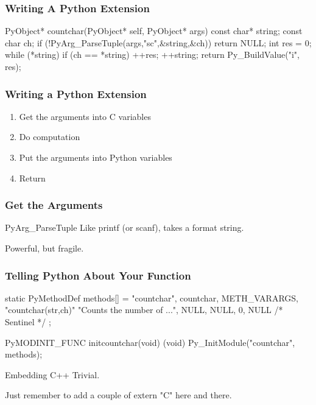 \begin{frame}[fragile]
\frametitle{Writing A Python Extension}

\begin{ccode}
PyObject* countchar(PyObject* self, PyObject* args) {
    const char* string;
    const char ch;
    if (!PyArg_ParseTuple(args,"sc",&string,&ch))
        return NULL;
    int res = 0;
    while (*string) {
        if (ch == *string) ++res;
        ++string;
    }
    return Py_BuildValue("i", res);
}
\end{ccode}
\end{frame}

\begin{frame}[fragile]
\frametitle{Writing a Python Extension}
\begin{enumerate}
\item Get the arguments into \alert{C variables}
\item Do computation
\item Put the arguments into \alert{Python variables}
\item Return
\end{enumerate}
\end{frame}

\begin{frame}[fragile]
\frametitle{Get the Arguments}

\begin{block}{PyArg\_ParseTuple}
Like \alert{printf} (or \alert{scanf}), takes a format string.

Powerful, but fragile.
\end{block}
\end{frame}

\begin{frame}[fragile]
\frametitle{Telling Python About Your Function}

\begin{ccode}
static PyMethodDef methods[] = {
    {"countchar",  countchar, METH_VARARGS,
            "countchar(str,ch)\n"
            "Counts the number of ..."},
    {NULL, NULL, 0, NULL} /* Sentinel */
};

PyMODINIT_FUNC initcountchar(void)
{
    (void) Py_InitModule("countchar", methods);
}
\end{ccode}

\end{frame}

\begin{frame}[fragile]

\begin{block}{Embedding C++}
Trivial.

Just remember to add a couple of
\alert{extern "C"} here and there.
\end{block}
\end{frame}

